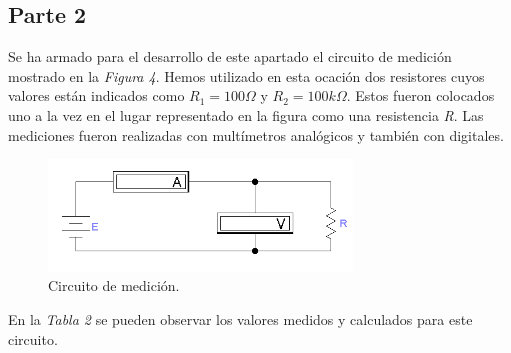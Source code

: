 \documentclass{article}
\begin{document}
\bigskip\bigskip


\subsection{Parte 2}


	Se ha armado para el desarrollo de este apartado el circuito de medición mostrado en la \textit{Figura 4}. Hemos utilizado en esta ocación dos resistores cuyos valores están indicados como \textit{$R_1=100\Omega$} y \textit{$R_2=100k\Omega$}. Estos fueron colocados uno a la vez en el lugar representado en la figura como una resistencia \textit{R}. Las mediciones fueron realizadas con multímetros analógicos y también con digitales.
\bigskip

\begin{figure}[h]
	\centering
	\includegraphics[width=0.72\textwidth]{images/p2-item-a.jpg}
	\caption{Circuito de medición.}
\end{figure}
\bigskip\bigskip


	En la \textit{Tabla 2} se pueden observar los valores medidos y calculados para este circuito.
\bigskip
\end{document}
